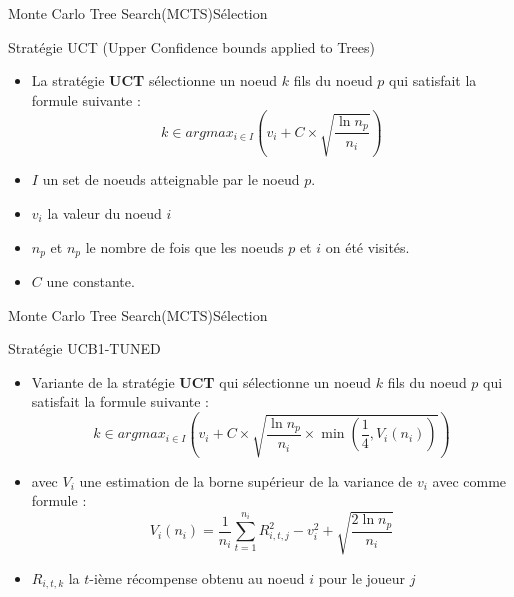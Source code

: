 \begin{frame}{Monte Carlo Tree Search(MCTS)}{Sélection}
	\begin{block}{Stratégie UCT (Upper Confidence bounds applied to Trees)}
		\begin{itemize}
			\item La stratégie \textbf{UCT} sélectionne un noeud $k$ fils du noeud $p$ qui satisfait la formule suivante :
			      $$k \in argmax_{i\in I}(v_{i} + C \times \sqrt{\frac{\ln n_{p}}{n_{i}}})$$
			\item $I$ un set de noeuds atteignable par le noeud $p$.
			\item $v_{i}$ la valeur du noeud $i$
			\item $n_{p}$ et $n_{p}$ le nombre de fois que les noeuds $p$ et $i$ on été visités.
			\item $C$ une constante.
		\end{itemize}
	\end{block}
\end{frame}

\begin{frame}{Monte Carlo Tree Search(MCTS)}{Sélection}
	\begin{block}{Stratégie UCB1-TUNED}
		\begin{itemize}
			\item Variante de la stratégie \textbf{UCT} qui sélectionne un noeud $k$ fils du noeud $p$ qui satisfait la formule suivante :
			      $$k \in argmax_{i\in I}\left(v_{i} + C \times \sqrt{\frac{\ln n_{p}}{n_{i}}\times \min(\frac{1}{4}, V_{i}(n_{i}))}\right)$$
			\item avec $V_{i}$ une estimation de la borne supérieur de la variance de $v_{i}$ avec comme formule :
			      $$V_{i}(n_{i}) = \frac{1}{n_{i}}\sum_{t=1}^{n_{i}}R_{i,t,j}^2 - v_{i}^2 + \sqrt{\frac{2\ln n_{p}}{n_{i}}}$$
			\item $R_{i,t,k}$ la $t$-ième récompense obtenu au noeud $i$ pour le joueur $j$
		\end{itemize}
	\end{block}
\end{frame}

